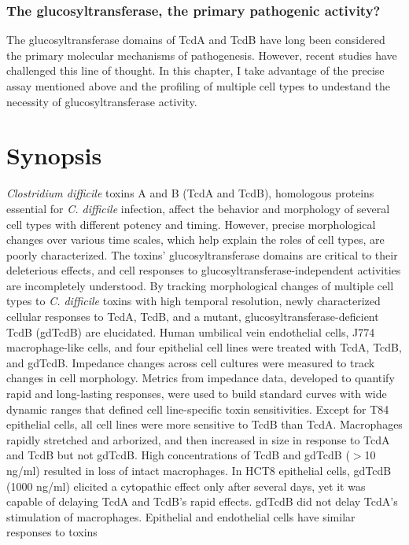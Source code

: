 \subsubsection{The glucosyltransferase, the primary pathogenic activity?}
The glucosyltransferase domains of TcdA and TcdB have
long been considered the primary molecular mechanisms of pathogenesis.
However, recent studies have challenged this line of thought.
In this chapter, I take advantage of the precise assay mentioned above
and the profiling of multiple cell types to undestand the necessity of
glucosyltransferase activity.


\section{Synopsis}
\textit{Clostridium difficile} toxins A and B (TcdA and TcdB), homologous 
proteins essential for \textit{C. difficile} infection, affect the behavior 
and morphology of several cell types with different potency and 
timing. However, precise morphological changes over various time scales, 
which help explain the roles of cell types, are poorly characterized. 
The toxins' glucosyltransferase domains are critical to their 
deleterious effects, and cell responses to glucosyltransferase-independent 
activities are incompletely understood. By tracking morphological 
changes of multiple cell types to \textit{C. difficile} toxins with high 
temporal resolution, newly characterized cellular responses to 
TcdA, TcdB, and a mutant, glucosyltransferase-deficient TcdB 
(gdTcdB) are elucidated.
Human umbilical vein endothelial cells, J774 macrophage-like 
cells, and four epithelial cell lines were treated with TcdA, 
TcdB, and gdTcdB. Impedance changes across cell cultures were 
measured to track changes in cell morphology. Metrics from 
impedance data, developed to quantify rapid and long-lasting 
responses, were used to build standard curves with wide dynamic 
ranges that defined cell line-specific toxin sensitivities. Except 
for T84 epithelial cells, all cell lines were more sensitive to TcdB 
than TcdA. Macrophages rapidly stretched and arborized, and then 
increased in size in response to TcdA and TcdB but not gdTcdB. 
High concentrations of TcdB and gdTcdB ($>$10 ng/ml) resulted 
in loss of intact macrophages. In HCT8 epithelial cells, 
gdTcdB (1000 ng/ml) elicited a cytopathic effect only after 
several days, yet it was capable of delaying TcdA and TcdB's 
rapid effects. gdTcdB did not delay TcdA's stimulation of macrophages.
Epithelial and endothelial cells have similar responses to toxins 
